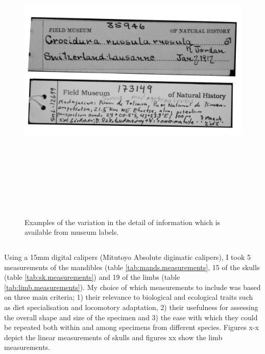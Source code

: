 \begin{figure}[h] 
  \centering
  \includegraphics[width = 15cm, height = 15cm, keepaspectratio=true]{Methods/figures/labels.png}
    \caption[Examples of museum labels]
    {Examples of the variation in the detail of information which is available from museum labels.}
  \label{fig:museum.labels}
\end{figure}
  
\subsection{} 
\label{sect:measurements} %

	Using a 15mm digital calipers (Mitutoyo Absolute digimatic calipers), I took 5 measurements of the mandibles (table \ref{tab:mands.measurements}, 15 of the skulls (table \ref{tab:sk.measurements}) and 19 of the limbs (table \ref{tab:limb.measurements}). My choice of which measurements to include was based on three main criteria; 1) their relevance to biological and ecological traits such as diet specialisation and locomotory adaptation, 2) their usefulness for assessing the overall shape and size of the specimen and 3) the ease with which they could be repeated both within and among specimens from different species. 
	Figures x-x depict the linear measurements of skulls and figures xx show the limb measurements. 
	
